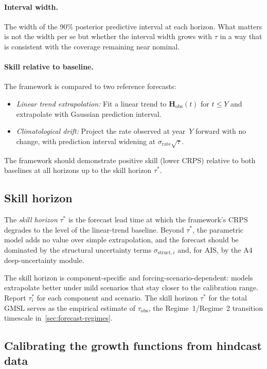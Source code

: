 \documentclass[11pt]{article}
\begin{document}
\paragraph{Interval width.}  The width of the 90\% posterior predictive interval at each horizon.  What matters is not the width per se but whether the interval width grows with $\tau$ in a way that is consistent with the coverage remaining near nominal.

\paragraph{Skill relative to baseline.}  The framework is compared to two reference forecasts:
\begin{itemize}
  \item \emph{Linear trend extrapolation:} Fit a linear trend to $\mathbf{H}_{\text{obs}}(t)$ for $t \leq Y$ and extrapolate with Gaussian prediction interval.
  \item \emph{Climatological drift:} Project the rate observed at year~$Y$ forward with no change, with prediction interval widening at $\sigma_{\text{rate}} \sqrt{\tau}$.
\end{itemize}
The framework should demonstrate positive skill (lower CRPS) relative to both baselines at all horizons up to the skill horizon $\tau^*$.

\subsection{Skill horizon}

The \emph{skill horizon} $\tau^*$ is the forecast lead time at which the framework's CRPS degrades to the level of the linear-trend baseline.  Beyond $\tau^*$, the parametric model adds no value over simple extrapolation, and the forecast should be dominated by the structural uncertainty terms $\sigma_{\text{struct},i}$ and, for AIS, by the A4 deep-uncertainty module.

The skill horizon is component-specific and forcing-scenario-dependent: models extrapolate better under mild scenarios that stay closer to the calibration range.  Report $\tau^*_i$ for each component and scenario.  The skill horizon $\tau^*$ for the total GMSL serves as the empirical estimate of $\tau_{\text{obs}}$, the Regime~1/Regime~2 transition timescale in~\cref{sec:forecast-regimes}.

\subsection{Calibrating the growth functions from hindcast data}
\end{document}
